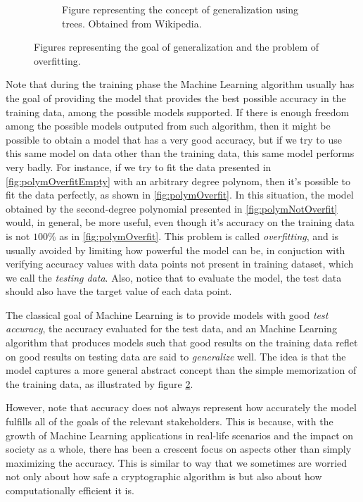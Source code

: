 \begin{figure}[ht]
\begin{subfigure}[b]{0.24\textwidth}
\caption{Figure representing the concept of generalization using trees. Obtained from Wikipedia.}\label{fig:GeneralizationTreesWikipedia}
\end{subfigure}
\caption{Figures representing the goal of generalization and the problem of overfitting.}
\end{figure}

Note that during the training phase the Machine Learning algorithm usually has the goal of providing the model that provides the best possible accuracy in the training data, among the possible models supported. If there is enough freedom among the possible models outputed from such algorithm, then it might be possible to obtain a model that has a very good accuracy, but if we try to use this same model on data other than the training data, this same model performs very badly. For instance, if we try to fit the data presented in \ref{fig:polymOverfitEmpty} with an arbitrary degree polynom, then it's possible to fit the data perfectly, as shown in \ref{fig:polymOverfit}. In this situation, the model obtained by the second-degree polynomial presented in \ref{fig:polymNotOverfit} would, in general, be more useful, even though it's accuracy on the training data is not $100\%$ as in \ref{fig:polymOverfit}. This problem is called \emph{overfitting}, and is usually avoided by limiting how powerful the model can be, in conjuction with verifying accuracy values with data points not present in training dataset, which we call the \emph{testing data}. Also, notice that to evaluate the model, the test data should also have the target value of each data point.


The classical goal of Machine Learning is to provide models with good \emph{test accuracy}, the accuracy evaluated for the test data, and an Machine Learning algorithm that produces models such that good results on the training data reflet on good results on testing data are said to \emph{generalize} well. The idea is that the model captures a more general abstract concept than the simple memorization of the training data, as illustrated by figure \ref{fig:GeneralizationTreesWikipedia}. 

However, note that accuracy does not always represent how accurately the model fulfills all of the goals of the relevant stakeholders. This is because, with the growth of Machine Learning applications in real-life scenarios and the impact on society as a whole, there has been a crescent focus on aspects other than simply maximizing the accuracy. This is similar to way that we sometimes are worried not only about how safe a cryptographic algorithm is but also about how computationally efficient it is. 

